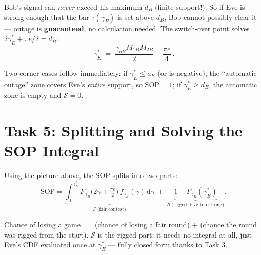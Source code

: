 \documentclass[11pt]{article}
\begin{document}
Bob's signal can \emph{never} exceed his maximum $d_B$ (finite support!). So if Eve is
strong enough that the bar $\tau(\gamma_E)$ is set above $d_B$, Bob cannot possibly
clear it --- outage is \textbf{guaranteed}, no calculation needed. The switch-over
point solves $2\gamma_E^{*} + \pi e/2 = d_B$:
\[
\boxed{\ \gamma_E^{*} \;=\; \frac{\gamma_{oB} M_{1B} M_{2B}}{2} - \frac{\pi e}{4}\ }.
\]

\begin{center}
\end{center}

Two corner cases follow immediately:
if $\gamma_E^{*}\le a_E$ (or is negative), the ``automatic outage'' zone covers
Eve's \emph{entire} support, so $\mathrm{SOP}=1$; if $\gamma_E^{*}\ge d_E$, the
automatic zone is empty and $\mathcal S = 0$.

\section{Task 5: Splitting and Solving the SOP Integral}

Using the picture above, the SOP splits into two parts:
\[
\mathrm{SOP}
=\underbrace{\int_{0}^{\gamma_E^{*}} F_{\gamma_B}\!\big(2\gamma+\tfrac{\pi e}{2}\big)\, f_{\gamma_E}(\gamma)\,\mathrm{d}\gamma}_{\mathcal I \ \text{(fair contest)}}
\;+\;
\underbrace{1-F_{\gamma_E}(\gamma_E^{*})}_{\mathcal S \ \text{(rigged: Eve too strong)}} .
\]

\begin{analogybox}
Chance of losing a game $=$ (chance of losing a fair round) $+$ (chance the round was
rigged from the start). $\mathcal S$ is the rigged part: it needs no integral at all,
just Eve's CDF evaluated once at $\gamma_E^{*}$ --- fully closed form thanks to Task 3.
\end{analogybox}
\end{document}
